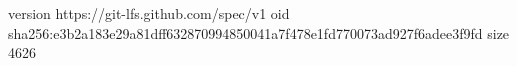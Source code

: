 version https://git-lfs.github.com/spec/v1
oid sha256:e3b2a183e29a81dff632870994850041a7f478e1fd770073ad927f6adee3f9fd
size 4626

